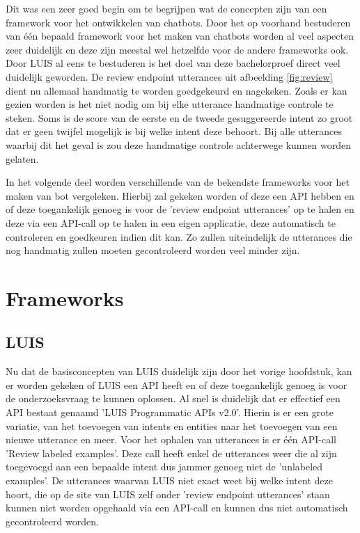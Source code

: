 Dit was een zeer goed begin om te begrijpen wat de concepten zijn van een framework voor het ontwikkelen van chatbots. Door het op voorhand bestuderen van één bepaald framework voor het maken van chatbots worden al veel aspecten zeer duidelijk en deze zijn meestal wel hetzelfde voor de andere frameworks ook. Door LUIS al eens te bestuderen is het doel van deze bachelorproef direct veel duidelijk geworden. De review endpoint utterances uit afbeelding \ref{fig:review} dient nu allemaal handmatig te worden goedgekeurd en nagekeken. Zoals er kan gezien worden is het niet nodig om bij elke utterance handmatige controle te steken. Soms is de score van de eerste en de tweede gesuggereerde intent zo groot dat er geen twijfel mogelijk is bij welke intent deze behoort. Bij alle utterances waarbij dit het geval is zou deze handmatige controle achterwege kunnen worden gelaten.

In het volgende deel worden verschillende van de bekendste frameworks voor het maken van bot vergeleken. Hierbij zal gekeken worden of deze een API hebben en of deze toegankelijk genoeg is voor de 'review endpoint utterances' op te halen en deze via een API-call op te halen in een eigen applicatie, deze automatisch te controleren en goedkeuren indien dit kan. Zo zullen uiteindelijk de utterances die nog handmatig zullen moeten gecontroleerd worden veel minder zijn.

\section{Frameworks}
\label{sec:Frameworks}

\subsection{LUIS}
\label{Luis}

Nu dat de basisconcepten van LUIS duidelijk zijn door het vorige hoofdstuk, kan er worden gekeken of LUIS een API heeft en of deze toegankelijk genoeg is voor de onderzoeksvraag te kunnen oplossen. Al snel is duidelijk dat er effectief een API bestaat genaamd 'LUIS Programmatic APIs v2.0'. Hierin is er een grote variatie, van het toevoegen van intents en entities naar het toevoegen van een nieuwe utterance en meer. Voor het ophalen van utterances is er één API-call 'Review labeled examples'. Deze call heeft enkel de utterances weer die al zijn toegevoegd aan een bepaalde intent dus jammer genoeg niet de 'unlabeled examples'. De utterances waarvan LUIS niet exact weet bij welke intent deze hoort, die op de site van LUIS zelf onder 'review endpoint utterances' staan kunnen niet worden opgehaald via een API-call en kunnen dus niet automatisch gecontroleerd worden.


